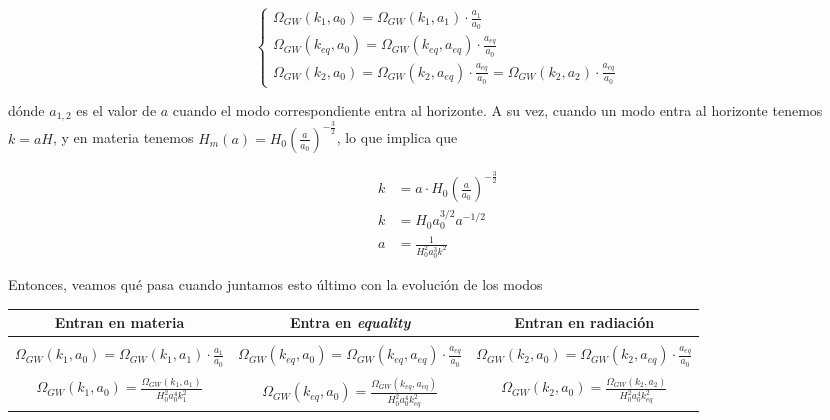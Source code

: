 \begin{equation*}
    \begin{cases}
        \displaystyle \Omega_{GW} (k_1, a_0) = \Omega_{GW} (k_1, a_1) \cdot \frac{a_1}{a_0}\\
        \displaystyle \Omega_{GW} (k_{eq}, a_0) = \Omega_{GW} (k_{eq}, a_{eq}) \cdot \frac{a_{eq}}{a_0}\\
        \displaystyle \Omega_{GW} (k_{2}, a_0) = \Omega_{GW} (k_2, a_{eq}) \cdot \frac{a_{eq}}{a_0} = \Omega_{GW} (k_2, a_2) \cdot \frac{a_{eq}}{a_0}
    \end{cases}
\end{equation*}

\noindent
dónde $a_{1,2}$ es el valor de $a$ cuando el modo correspondiente entra al horizonte. A su vez, cuando un modo entra al horizonte tenemos $k = a H$, y en materia tenemos $\displaystyle H_m (a) = H_0 \left( \frac{a}{a_{0}} \right)^{\displaystyle - \frac{3}{2}}$, lo que implica que 

\begin{equation*}
    \begin{split}
        k &= a \cdot H_0 \left( \frac{a}{a_0} \right)^{\displaystyle - \frac{3}{2}}\\
        k &= H_0 a^{3/2}_0 a^{-1/2}\\
        a &= \frac{1}{H_0^2 a^3_0 k^2}
    \end{split}
\end{equation*}

Entonces, veamos qué pasa cuando juntamos esto último con la evolución de los modos

\begin{center}
    \begin{tabular}{|c|c|c|}
        \hline Entran en materia & Entra en \textit{equality} & Entran en radiación \\
        \hline & & \\ 
        $\displaystyle \Omega_{GW} (k_1, a_0) = \Omega_{GW} (k_1, a_1) \cdot \frac{a_1}{a_0}$ & $\displaystyle \Omega_{GW} (k_{eq}, a_0) = \Omega_{GW} (k_{eq}, a_{eq}) \cdot \frac{a_{eq}}{a_0}$& $\displaystyle \Omega_{GW} (k_{2}, a_0) = \Omega_{GW} (k_{2}, a_{eq}) \cdot \frac{a_{eq}}{a_0}$\\
        & & \\
        $\displaystyle \Omega_{GW} (k_1, a_0) = \frac{\Omega_{GW} (k_1, a_1)}{H_0^2 a_0^4 k^2_1}$ & $\displaystyle \Omega_{GW} (k_{eq}, a_0) = \frac{\Omega_{GW} (k_{eq}, a_{eq})}{H_0^2 a_0^4 k^2_{eq}}$ & $\displaystyle \Omega_{GW} (k_{2}, a_{0}) = \frac{\Omega_{GW} (k_{2}, a_{2})}{H_0^2 a_0^4 k^2_{eq}}$\\
        \hline
    \end{tabular}
\end{center}


